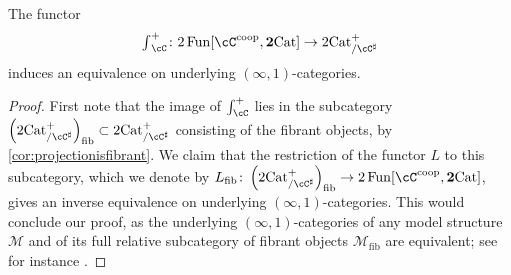 \documentclass[11pt, dvipsnames]{amsart}
\begin{document}
\begin{cor}
\label{eq.infty}
The functor 
   $${\textstyle \int}_{\cC}^+ \colon 2\Fun[\cC^{\coop},\ttwocat] \to  \mslicetwocat$$
   induces an equivalence on underlying $(\infty,1)$-categories.
\end{cor}
\begin{proof}
First note that the image of $\int_\cC^+$ lies in the subcategory $\left(\mslicetwocat\right)_{\textrm{fib}}\subset \mslicetwocat$ consisting of the fibrant objects, by \cref{cor:projectionisfibrant}. We claim that the restriction of the functor $L$ to this subcategory, which we denote by $L_\textrm{fib}\colon \left(\mslicetwocat\right)_{\textrm{fib}}\to 2\Fun[\cC^{\coop},\ttwocat]$, gives an inverse equivalence on underlying $(\infty,1)$-categories. This would conclude our proof, as the underlying $(\infty, 1)$-categories of any model structure $\mathcal{M}$ and of its full relative subcategory of fibrant objects $\mathcal{M}_\textrm{fib}$ are equivalent; see for instance \cite[Proposition 5.2]{dwyerkan}. 


\end{proof}
\end{document}
